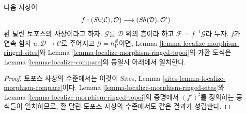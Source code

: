 \begin{lemma}
\label{lemma-localize-morphism-compare}
다음 사상이
$$
f :
(\mathop{\mathit{Sh}}\nolimits(\mathcal{C}), \mathcal{O})
\longrightarrow
(\mathop{\mathit{Sh}}\nolimits(\mathcal{D}), \mathcal{O}')
$$
환 달린 토포스의 사상이라고 하자. $\mathcal{G}$를 $\mathcal{D}$ 위의 층이라
하고 $\mathcal{F} = f^{-1}\mathcal{G}$라 두자. $f$가 연속 함자
$u : \mathcal{D} \to \mathcal{C}$로 주어지고 $\mathcal{G} = h_V^\#$이면,
Lemma \ref{lemma-localize-morphism-ringed-sites}와
Lemma \ref{lemma-localize-morphism-ringed-topoi}의 가환 도식은
Lemma \ref{lemma-localize-compare}의 동일시 아래에서 일치한다.
\end{lemma}

\begin{proof}
토포스 사상의 수준에서는 이것이 Sites, Lemma
\ref{sites-lemma-localize-morphism-compare}이다.
Lemma \ref{lemma-localize-morphism-ringed-sites}와
Lemma \ref{lemma-localize-morphism-ringed-topoi}의 증명에서
$(f')^\sharp$를 정의하는 공식들이 일치하므로, 환 달린 토포스 사상의
수준에서도 같은 결과가 성립한다.
\end{proof}

